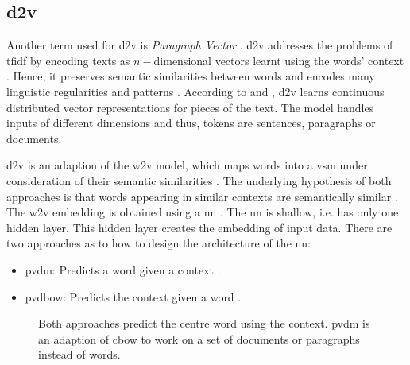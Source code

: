 \subsection{\ac{d2v}}\label{subsec:doc2vec}

Another term used for \ac{d2v} is \textit{Paragraph Vector} \cite{clusteringDocs2020, SentRep2014}.
\ac{d2v} addresses the problems of \ac{tfidf} by encoding texts as $n-$dimensional vectors learnt using the words' context \cite{clusteringDocs2020}.
Hence, it preserves semantic similarities between words and encodes many linguistic regularities and patterns \cite{SkipGram2013}.
According to \citeauthor{clusteringDocs2020} and \citeauthor{SentRep2014}, 
\ac{d2v} learns continuous distributed vector representations for pieces of the text.
The model handles inputs of different dimensions and thus, tokens are sentences, paragraphs or documents.

\ac{d2v} is an adaption of the \ac{w2v} model, which maps words into a \ac{vsm} under consideration of their semantic similarities \cite{clusteringDocs2020}.
The underlying hypothesis of both approaches is that words appearing in similar contexts are semantically similar \cite{clusteringDocs2020}.
The \ac{w2v} embedding is obtained using a \ac{nn} \cite{clusteringDocs2020}.
The \ac{nn} is shallow, i.e. has only one hidden layer.
This hidden layer creates the embedding of input data.
There are two approaches as to how to design the architecture of the \ac{nn}:
\begin{itemize}
    \item \ac{pvdm}: 
        Predicts a word given a context \cite{SentRep2014, WordRep2013}.
    \item \ac{pvdbow}: 
        Predicts the context given a word \cite{EmbDist2015, SkipGram2013, SentRep2014}.
\end{itemize}


\begin{figure}%
    \centering
    \qquad
    \caption{Both approaches predict the centre word using the context.
    \ac{pvdm} is an adaption of \ac{cbow} to work on a set of documents or paragraphs instead of words.
    }%
    \label{fig:pvdm}%
\end{figure}
 
